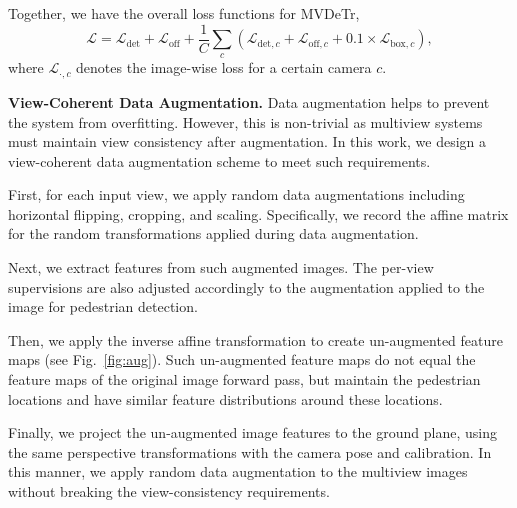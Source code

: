 \documentclass[sigconf,authorversion,nonacm]{acmart}
\begin{document}
Together, we have the overall loss functions for MVDeTr,
\begin{equation}
\label{eq:loss}
    \mathcal{L} = \mathcal{L}_\text{det}+\mathcal{L}_\text{off}+\frac{1}{C}\sum_{c}{\left( \mathcal{L}_{\text{det},c}+\mathcal{L}_{\text{off},c}+0.1\times \mathcal{L}_{\text{box},c}\right)},
\end{equation}
where $\mathcal{L}_{\cdot,c}$ denotes the image-wise loss for a certain camera $c$. 



\textbf{View-Coherent Data Augmentation.}
Data augmentation helps to prevent the system from overfitting. However, this is non-trivial as multiview systems must maintain view consistency after augmentation. In this work, we design a view-coherent data augmentation scheme to meet such requirements. 

First, for each input view, we apply random data augmentations including horizontal flipping, cropping, and scaling. Specifically, we record the affine matrix for the random transformations applied during data augmentation. 

Next, we extract features from such augmented images. The per-view supervisions are also adjusted accordingly to the augmentation applied to the image for pedestrian detection. 


Then, we apply the inverse affine transformation to create un-augmented feature maps (see Fig.~\ref{fig:aug}). Such un-augmented feature maps do not equal the feature maps of the original image forward pass, but maintain the pedestrian locations and have similar feature distributions around these locations. 

Finally, we project the un-augmented image features to the ground plane, using the same perspective transformations with the camera pose and calibration. In this manner, we apply random data augmentation to the multiview images without breaking the view-consistency requirements. 
\end{document}
